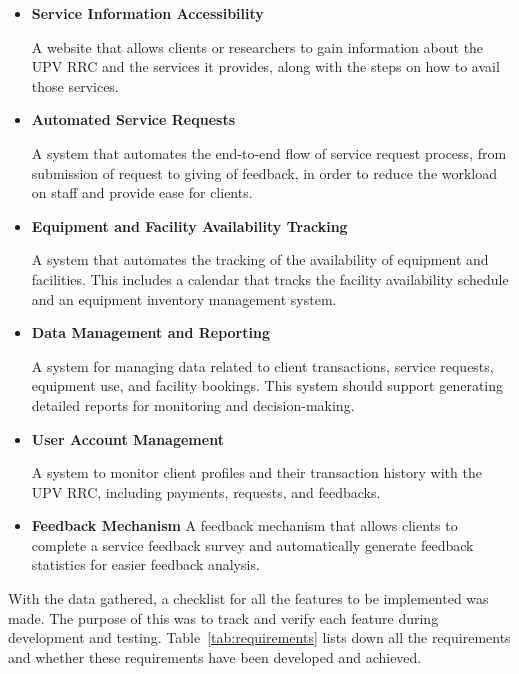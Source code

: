 \begin{itemize}
	\item \textbf{Service Information Accessibility}
	
	A website that allows clients or researchers to gain information about the UPV RRC and the services it provides, along with the steps on how to avail those services. 
	
	\item \textbf{Automated Service Requests}
	
	A system that automates the end-to-end flow of service request process, from submission of request to giving of feedback, in order to reduce the workload on staff and provide ease for clients.
	
	\item \textbf{Equipment and Facility Availability Tracking}
	
	A system that automates the tracking of the availability of equipment and facilities. This includes a calendar that tracks the facility availability schedule and an equipment inventory management system. 
	
	\item \textbf{Data Management and Reporting}
	
	A system for managing data related to client transactions, service requests, equipment use, and facility bookings. This system should support generating detailed reports for monitoring and decision-making.
	
	\item \textbf{User Account Management}
	
	A system to monitor client profiles and their transaction history with the UPV RRC, including payments, requests, and feedbacks.
	
	\item \textbf{Feedback Mechanism}
	A feedback mechanism that allows clients to complete a service feedback survey and automatically generate feedback statistics for easier feedback analysis.
	
\end{itemize}

With the data gathered, a checklist for all the features to be implemented was made. The purpose of this was to track and verify each feature during development and testing. Table~\ref{tab:requirements} lists down all the requirements and whether these requirements have been developed and achieved.

\newpage

